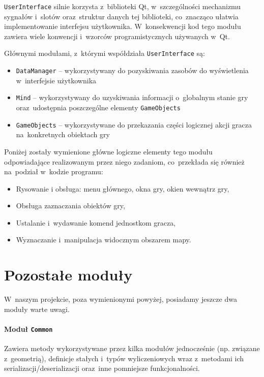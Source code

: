 \documentclass[licencjacka]{pracamgr}
\begin{document}
    \texttt{UserInterface} silnie korzysta z~biblioteki Qt, w~szczególności mechanizmu sygnałów i~slotów oraz~struktur
    danych tej biblioteki, co~znacząco ułatwia implementowanie interfejsu użytkownika. W~konsekwencji kod tego modułu
    zawiera wiele konwencji i~wzorców programistycznych używanych w~Qt.

    Głównymi modułami, z~którymi współdziała \texttt{UserInterface} są:
    \begin{itemize}
      \item \texttt{DataManager} -- wykorzystywany do pozyskiwania zasobów do wyświetlenia w~interfejsie użytkownika
      \item \texttt{Mind} -- wykorzystywany do uzyskiwania informacji o~globalnym stanie gry oraz~udostępnia poszczególne
      elementy \texttt{GameObjects}
      \item \texttt{GameObjects} -- wykorzystywane do przekazania części logicznej akcji gracza na~konkretnych obiektach
      gry
    \end{itemize}

    Poniżej zostały wymienione główne logiczne elementy tego modułu odpowiadające realizowanym przez niego zadaniom,
    co~przekłada się również na~podział w~kodzie programu:

    \begin{itemize}
      \item Rysowanie i obsługa: menu głównego, okna gry, okien wewnątrz gry,
      \item Obsługa zaznaczania obiektów gry,
      \item Ustalanie i~wydawanie komend jednostkom gracza,
      \item Wyznaczanie i~manipulacja widocznym obszarem mapy.
    \end{itemize}

  \section{Pozostałe moduły}
    W~naszym projekcie, poza wymienionymi powyżej, posiadamy jeszcze dwa moduły warte uwagi.
    \paragraph{Moduł \texttt{Common}}
      Zawiera metody wykorzystywane przez kilka modułów jednocześnie (np. związane z~geometrią), definicje stałych i~typów
      wyliczeniowych wraz z~metodami ich serializacji/deserializacji oraz~inne pomniejsze funkcjonalności.
\end{document}
